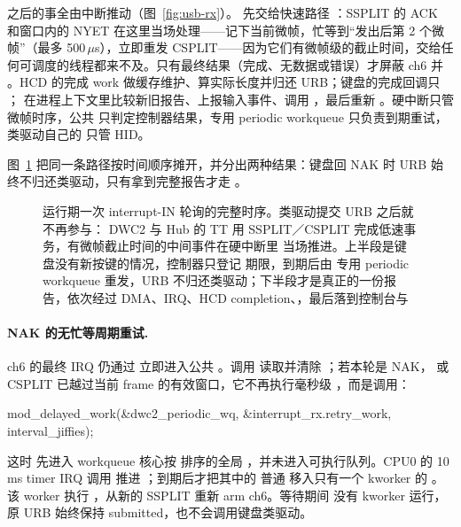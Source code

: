 之后的事全由中断推动（图~\ref{fig:usb-rx}）。 先交给快速路径 ：SSPLIT 的 ACK 和窗口内的 NYET 在这里当场处理——记下当前微帧，忙等到“发出后第 2 个微帧”（最多 500\,$\mu$s），立即重发 CSPLIT——因为它们有微帧级的截止时间，交给任何可调度的线程都来不及。只有最终结果（完成、无数据或错误）才屏蔽 ch6 并 。HCD 的完成 work 做缓存维护、算实际长度并归还 URB；键盘的完成回调只 ； 在进程上下文里比较新旧报告、上报输入事件、调用 ，最后重新 。硬中断只管微帧时序，公共  只判定控制器结果，专用 periodic workqueue 只负责到期重试，类驱动自己的  只管 HID。

图~\ref{fig:usb-irq-seq} 把同一条路径按时间顺序摊开，并分出两种结果：键盘回
NAK 时 URB 始终不归还类驱动，只有拿到完整报告才走
。

\begin{figure}[p]
  \centering
  \resizebox{\linewidth}{!}{%
  
  }
  \caption{运行期一次 interrupt-IN 轮询的完整时序。类驱动提交 URB 之后就不再参与：
  DWC2 与 Hub 的 TT 用 SSPLIT／CSPLIT 完成低速事务，有微帧截止时间的中间事件在硬中断里
  当场推进。上半段是键盘没有新按键的情况，控制器只登记  期限，到期后由
  专用 periodic workqueue 重发，URB 不归还类驱动；下半段才是真正的一份报告，依次经过
  DMA、IRQ、HCD completion、，最后落到控制台与 }
  \label{fig:usb-irq-seq}
\end{figure}

\paragraph{NAK 的无忙等周期重试.} ch6 的最终 IRQ 仍通过
立即进入公共
。调用
读取并清除 ；若本轮是 NAK，
或 CSPLIT 已越过当前 frame 的有效窗口，它不再执行毫秒级
，而是调用：

\begin{ccode}
mod_delayed_work(&dwc2_periodic_wq, &interrupt_rx.retry_work,
                 interval_jiffies);
\end{ccode}

这时  先进入 workqueue 核心按  排序的全局
，并未进入可执行队列。CPU0 的 10\,ms timer IRQ 调用
推进 ；到期后才把其中的
普通  移入只有一个 kworker 的
。该 worker 执行
，从新的 SSPLIT 重新 arm ch6。等待期间
没有 kworker 运行，原 URB 始终保持 submitted，也不会调用键盘类驱动。

